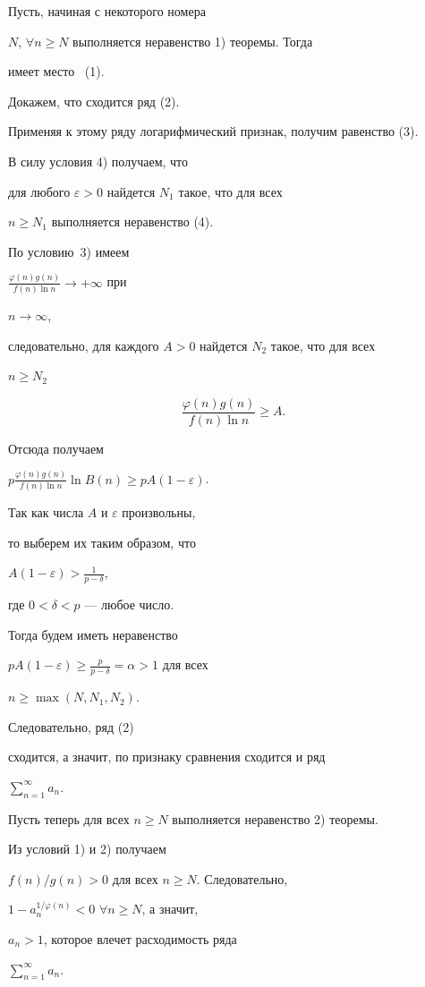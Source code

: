 \begin{pf}


Пусть, начиная с некоторого номера


$N$, $\forall n \geq N$ выполняется неравенство 1) теоремы. Тогда


имеет место ~(1).


Докажем, что сходится ряд (2).


Применяя к этому ряду логарифмический признак, получим равенство (3).





В силу условия 4) получаем, что


для любого $\varepsilon >0 $ найдется $N_1$ такое, что для всех


$n \geq N_1$ выполняется неравенство (4).


По условию~3) имеем


$\frac{\varphi (n) g(n)}{f(n) \ln n} \to +\infty $ при


$n \to \infty$,


следовательно, для каждого $A>0$ найдется $N_2$ такое, что для всех


$n \geq N_2$


$$


\frac{\varphi (n)g(n)}{f(n) \ln n}\geq A.


$$


Отсюда получаем


$p\frac{\varphi (n) g(n)}{f(n) \ln n} \ln B(n)\geq p A (1-\varepsilon)$.


Так как числа $A$ и $\varepsilon$ произвольны,


то выберем их таким образом, что


$A (1-\varepsilon) > \frac{1}{p-\delta}$,


где $0<\delta <p$ --- любое число.


Тогда будем иметь неравенство


$p A (1-\varepsilon )\geq \frac{p}{p-\delta}=\alpha >1$ для всех


$n \geq \max (N, N_1, N_2)$.


Следовательно, ряд (2)


сходится, а значит, по признаку сравнения сходится и ряд


$\sum\limits_{n=1}^{\infty} a_n$.





Пусть теперь для всех $ n \geq N$ выполняется неравенство 2) теоремы.


Из условий 1) и 2) получаем


$f(n)/g(n)>0$ для всех $n \geq N$. Следовательно,


$1-a_n^{1/\varphi(n)}<0$ \; $\forall n \geq N$, а значит,


$a_n>1$, которое влечет расходимость ряда


$\sum\limits_{n=1}^{\infty}a_n$.


\end{pf}






